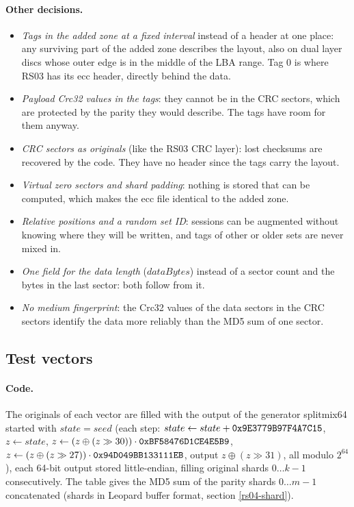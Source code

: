 \paragraph{Other decisions.}
\begin{itemize}
\item {\em Tags in the added zone at a fixed interval} instead of a header
  at one place: any surviving part of the added zone describes the layout,
  also on dual layer discs whose outer edge is in the middle of the LBA
  range. Tag 0 is where RS03 has its ecc header, directly behind the data.
\item {\em Payload Crc32 values in the tags}: they cannot be in the CRC
  sectors, which are protected by the parity they would describe. The tags
  have room for them anyway.
\item {\em CRC sectors as originals} (like the RS03 CRC layer): lost
  checksums are recovered by the code. They have no header since the tags
  carry the layout.
\item {\em Virtual zero sectors and shard padding}: nothing is stored that
  can be computed, which makes the ecc file identical to the added zone.
\item {\em Relative positions and a random set ID}: sessions can be
  augmented without knowing where they will be written, and tags of other
  or older sets are never mixed in.
\item {\em One field for the data length} ($dataBytes$) instead of a sector
  count and the bytes in the last sector: both follow from it.
\item {\em No medium fingerprint}: the Crc32 values of the data sectors in
  the CRC sectors identify the data more reliably than the MD5 sum of one
  sector.
\end{itemize}

\subsection{Test vectors}
\label{rs04-vectors}

\paragraph{Code.} The originals of each vector are filled with the output
of the generator splitmix64 started with $state = seed$ (each step:
$state \leftarrow state + {\tt 0x9E3779B97F4A7C15}$, $z \leftarrow state$,
$z \leftarrow (z \oplus (z \gg 30)) \cdot {\tt 0xBF58476D1CE4E5B9}$,
$z \leftarrow (z \oplus (z \gg 27)) \cdot {\tt 0x94D049BB133111EB}$,
output $z \oplus (z \gg 31)$, all modulo $2^{64}$), each 64-bit output
stored little-endian, filling original shards $0 \ldots k-1$ consecutively.
The table gives the MD5 sum of the parity shards $0 \ldots m-1$
concatenated (shards in Leopard buffer format, section \ref{rs04-shard}).

